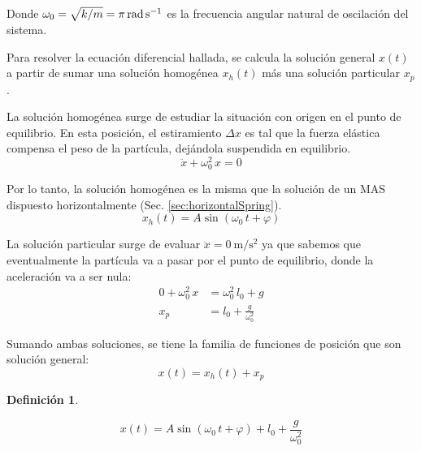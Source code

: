 \documentclass[a5paper,12pt,twoside]{book}
\newtheorem{defn}{{Definición}}[chapter]
\begin{document}
Donde $\omega_0 = \sqrt{k/m}=\pi\,\si{\radian\per\second}$ es la frecuencia angular natural de oscilación del sistema.

Para resolver la ecuación diferencial hallada, se calcula la solución general $x(t)$ a partir de sumar una solución homogénea $x_h(t)$ más una solución particular $x_p$.

La solución homogénea surge de estudiar la situación con origen en el punto de equilibrio. En esta posición, el estiramiento $\Delta x$ es tal que la fuerza elástica compensa el peso de la partícula, dejándola suspendida en equilibrio.
\[ \ddot{x} + \omega_0^2 \, x = 0 \]

Por lo tanto, la solución homogénea es la misma que la solución de un MAS dispuesto horizontalmente (Sec. \ref{sec:horizontalSpring}).
\[ x_h(t) = A \sin{(\omega_0 \, t + \varphi)} \]

La solución particular surge de evaluar $\ddot{x} = \SI{0}{\metre \per \second^2}$ ya que sabemos que eventualmente la partícula va a pasar por el punto de equilibrio, donde la aceleración va a ser nula:
\begin{align*}
    0 + \omega_0^2 \, x &= \omega_0^2 \, l_0 + g
    \\
    x_p &= l_0 + \frac{g}{\omega_0^2}
\end{align*}

Sumando ambas soluciones, se tiene la familia de funciones de posición que son solución general:
\begin{equation*}
    x(t) = x_h(t) + x_p
\end{equation*}

\begin{mdframed}[style=MyFrame1]
    \begin{defn}
    \end{defn}
    \begin{equation*}
        x(t) = A \sin{(\omega_0 \, t + \varphi)} + l_0 + \frac{g}{\omega_0^2}
    \end{equation*}
\end{mdframed}
\end{document}
